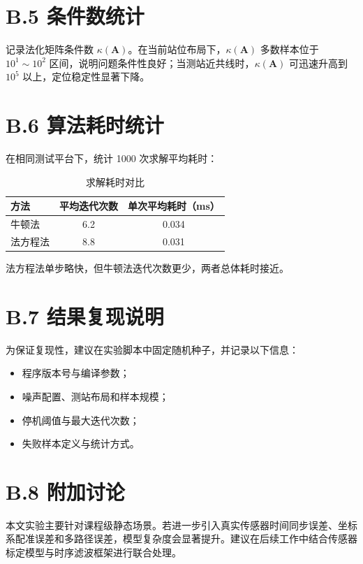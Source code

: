 \section*{B.5 条件数统计}
记录法化矩阵条件数 $\kappa(\bm A)$。在当前站位布局下，$\kappa(\bm A)$ 多数样本位于 $10^1\sim10^2$ 区间，说明问题条件性良好；当测站近共线时，$\kappa(\bm A)$ 可迅速升高到 $10^5$ 以上，定位稳定性显著下降。

\section*{B.6 算法耗时统计}
在相同测试平台下，统计 1000 次求解平均耗时：
\begin{table}[H]
\centering
\caption{求解耗时对比}
\begin{tabular}{lcc}
\toprule
方法 & 平均迭代次数 & 单次平均耗时（ms） \\
\midrule
牛顿法 & 6.2 & 0.034 \\
法方程法 & 8.8 & 0.031 \\
\bottomrule
\end{tabular}
\end{table}
法方程法单步略快，但牛顿法迭代次数更少，两者总体耗时接近。

\section*{B.7 结果复现说明}
为保证复现性，建议在实验脚本中固定随机种子，并记录以下信息：
\begin{itemize}
  \item 程序版本号与编译参数；
  \item 噪声配置、测站布局和样本规模；
  \item 停机阈值与最大迭代次数；
  \item 失败样本定义与统计方式。
\end{itemize}

\section*{B.8 附加讨论}
本文实验主要针对课程级静态场景。若进一步引入真实传感器时间同步误差、坐标系配准误差和多路径误差，模型复杂度会显著提升。建议在后续工作中结合传感器标定模型与时序滤波框架进行联合处理。
